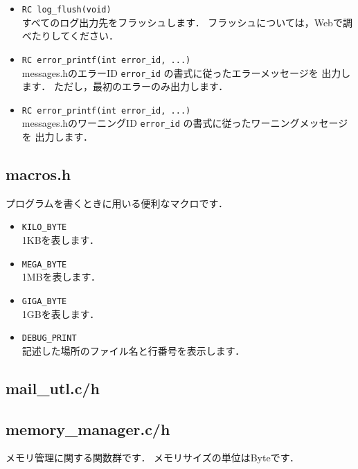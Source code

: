 \begin{itemize}
\item \texttt{RC log\_flush(void)} \ \\
すべてのログ出力先をフラッシュします．
フラッシュについては，Webで調べたりしてください．

\item \texttt{RC error\_printf(int error\_id, ...)} \ \\
messages.hのエラーID \texttt{error\_id} の書式に従ったエラーメッセージを
出力します．
ただし，最初のエラーのみ出力します．

\item \texttt{RC error\_printf(int error\_id, ...)} \ \\
messages.hのワーニングID \texttt{error\_id} の書式に従ったワーニングメッセージを
出力します．
\end{itemize}

\subsection{macros.h}
プログラムを書くときに用いる便利なマクロです．

\begin{itemize}
\item \texttt{KILO\_BYTE} \ \\
1KBを表します．

\item \texttt{MEGA\_BYTE} \ \\
1MBを表します．

\item \texttt{GIGA\_BYTE} \ \\
1GBを表します．

\item \texttt{DEBUG\_PRINT} \ \\
記述した場所のファイル名と行番号を表示します．
\end{itemize}

\subsection{mail\_utl.c/h}

\subsection{memory\_manager.c/h}
メモリ管理に関する関数群です．
メモリサイズの単位はByteです．

